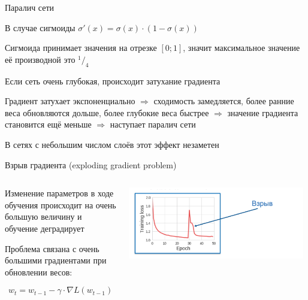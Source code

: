 \documentclass[notes,12pt, aspectratio=169]{beamer}
\newenvironment{wideitemize}{\itemize\addtolength{\itemsep}{10pt}}{\enditemize}
\begin{document}
\begin{frame}{Паралич сети}
	\begin{wideitemize}
		\item  В случае сигмоиды $\sigma'(x) = \sigma(x) \cdot (1 - \sigma(x))$ 
		
		\item Сигмоида принимает значения на отрезке $[0; 1]$, значит максимальное значение её производной это $^1/_4$
		
		\item Если сеть очень глубокая, происходит \alert{затухание градиента} 
		
		\item Градиент затухает экспоненциально $\Rightarrow$ сходимость замедляется, более ранние веса обновляются дольше, более глубокие веса быстрее  $\Rightarrow$ значение градиента становится ещё меньше $\Rightarrow$ наступает \alert{паралич сети} 
		
		\item В сетях с небольшим числом слоёв этот эффект незаметен
	\end{wideitemize} 
\end{frame}


\begin{frame}{Взрыв градиента (exploding gradient problem)}
\begin{columns}
	\begin{column}{0.4\textwidth}
		\begin{wideitemize}
			\item  Изменение параметров в ходе обучения происходит на очень большую величину и обучение деградирует
			
			\item Проблема связана с очень большими градиентами при обновлении весов:
			
			$$
			w_t = w_{t-1} - \gamma \cdot \nabla L(w_{t-1})
			$$
			
		\end{wideitemize}
	\end{column}
	\hfill
	\begin{column}{0.6\textwidth}
		
		\begin{center}
				\includegraphics[width=0.98\textwidth]{exp_grad.png} 
		\end{center} 
	\end{column}
\end{columns}
\end{frame}
\end{document}
